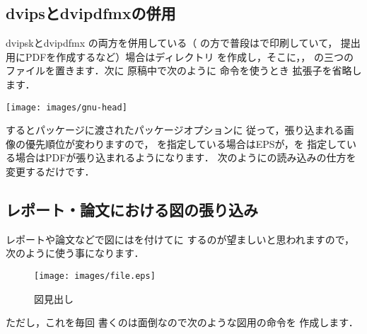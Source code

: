 \subsection{dvipsと{dvipdfmx}の併用}

dvipskとdvipdfmx の両方を併用している（
の方で普段は\PS で印刷していて，
提出用にPDFを作成するなど）場合はディレクトリ
を作成し，そこに，，
の三つのファイルを置きます．次に
原稿中で次のように  命令を使うとき
{拡張子を省略します}．

\begin{intext}
\texttt{[image: images/gnu-head]}
\end{intext}

するとパッケージに渡されたパッケージオプションに
従って，張り込まれる画像の優先順位が変わりますので，
を指定している場合はEPSが，を
指定している場合はPDFが張り込まれるようになります．
次のようにの読み込みの仕方を変更するだけです．

\begin{intext}
\usepackage[dvipdfmx]{graphicx} %
\end{intext}


\subsection{レポート・論文における図の張り込み}

レポートや論文などで図にはを付けてに
するのが望ましいと思われますので，次のように使う事になります．

\begin{intext}
\begin{figure}[htbp]
 \begin{center}
   \texttt{[image: images/file.eps]}
   \caption{図見出し}\label{fig:samplefig}
 \end{center} 
\end{figure} 
\end{intext}

ただし，これを毎回
書くのは面倒なので次のような図用の命令を
作成します．


